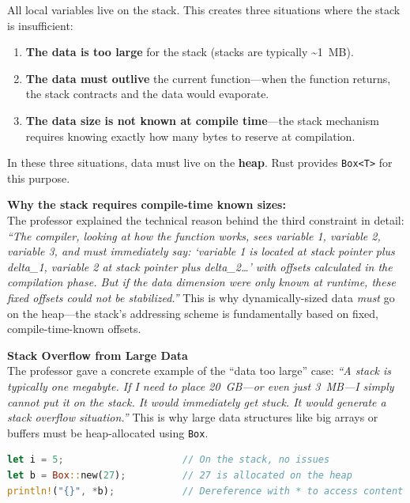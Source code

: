 All local variables live on the stack. This creates three situations where the stack is insufficient:

\begin{enumerate}
    \item \textbf{The data is too large} for the stack (stacks are typically \textasciitilde1~MB).
    \item \textbf{The data must outlive} the current function---when the function returns, the stack contracts and the data would evaporate.
    \item \textbf{The data size is not known at compile time}---the stack mechanism requires knowing exactly how many bytes to reserve at compilation.
\end{enumerate}

In these three situations, data must live on the \textbf{heap}. Rust provides \texttt{Box<T>} for this purpose.

\begin{memoryblock}
\textbf{Why the stack requires compile-time known sizes:} \\
The professor explained the technical reason behind the third constraint in detail: \emph{``The compiler, looking at how the function works, sees variable 1, variable 2, variable 3, and must immediately say: `variable 1 is located at stack pointer plus delta\_1, variable 2 at stack pointer plus delta\_2\ldots' with offsets calculated in the compilation phase. But if the data dimension were only known at runtime, these fixed offsets could not be stabilized.''} This is why dynamically-sized data \emph{must} go on the heap---the stack's addressing scheme is fundamentally based on fixed, compile-time-known offsets.
\end{memoryblock}

\begin{insightbox}
\textbf{Stack Overflow from Large Data} \\
The professor gave a concrete example of the ``data too large'' case: \emph{``A stack is typically one megabyte. If I need to place 20~GB---or even just 3~MB---I simply cannot put it on the stack. It would immediately get stuck. It would generate a stack overflow situation.''} This is why large data structures like big arrays or buffers must be heap-allocated using \texttt{Box}.
\end{insightbox}

\begin{lstlisting}[language=Rust]
let i = 5;                     // On the stack, no issues
let b = Box::new(27);          // 27 is allocated on the heap
println!("{}", *b);            // Dereference with * to access content
\end{lstlisting}

